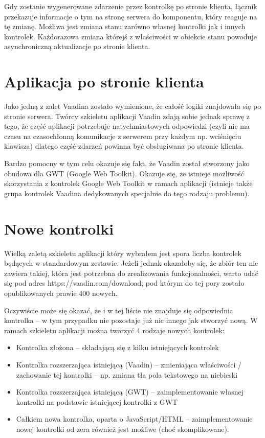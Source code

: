 Gdy zostanie wygenerowane zdarzenie przez kontrolkę po stronie klienta, łącznik przekazuje informacje o tym na stronę serwera do komponentu, który reaguje na tę zmianę. Możliwa jest zmiana stanu zarówno własnej kontrolki jak i innych kontrolek. Każdorazowa zmiana którejś z właściwości w obiekcie stanu powoduje asynchroniczną aktualizacje po stronie klienta.

\newpage
\section{Aplikacja po stronie klienta}
Jako jedną z zalet Vaadina zostało wymienione, że całość logiki znajdowała się po stronie serwera. Twórcy szkieletu aplikacji Vaadin zdają sobie jednak sprawę z tego, że część aplikacji potrzebuje natychmiastowych odpowiedzi (czyli nie ma czasu na czasochłonną komunikacje z serwerem przy każdym np. wciśnięciu klawisza) dlatego część zdarzeń powinna być obsługiwana po stronie klienta. 

Bardzo pomocny w tym celu okazuje się fakt, że Vaadin został stworzony jako obudowa dla GWT (Google Web Toolkit). Okazuje się, że istnieje możliwość skorzystania z kontrolek Google Web Toolkit w ramach aplikacji (istnieje także grupa kontrolek Vaadina dedykowanych specjalnie do tego rodzaju problemu).

\section{Nowe kontrolki}
Wielką zaletą szkieletu aplikacji który wybrałem jest spora liczba kontrolek będących w standardowym zestawie. Jeżeli jednak okazałoby się, że zbiór ten nie zawiera takiej, która jest potrzebna do zrealizowania funkcjonalności, warto udać się pod adres https://vaadin.com/download, pod którym do tej pory zostało opublikowanych prawie 400 nowych. 

Oczywiście może się okazać, że i w tej liście nie znajduje się odpowiednia kontrolka – w tym przypadku nie pozostaje już nic innego jak stworzyć nową. W ramach szkieletu aplikacji można tworzyć 4 rodzaje nowych kontrolek:
\begin{itemize}
\item Kontrolka złożona – składającą się z kilku istniejących kontrolek
\item Kontrolka rozszerzająca istniejącą (Vaadin) – zmieniająca właściwości / zachowanie tej kontrolki – np. zmiana tła pola tekstowego na niebieski
\item Kontrolka rozszerzająca istniejącą (GWT) – zaimplementowanie własnej kontrolki na podstawie istniejącej kontrolki z GWT
\item Całkiem nowa kontrolka, oparta o JavaScript/HTML – zaimplementowanie nowej kontrolki od zera również jest możliwe (choć skomplikowane).
\end{itemize}

